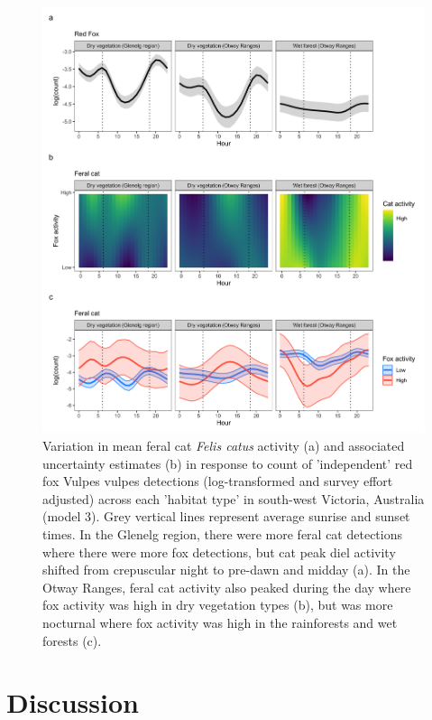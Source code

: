 \documentclass[11pt,a4paper,titlepage,twoside,openright]{style/unimelbthesis}
\begin{document}
\begin{mainmatter}
\begin{figure}
{\centering \includegraphics[width=1\linewidth]{figure/cat_fox_count} 

}

\caption{Variation in mean feral cat \textit{Felis catus} activity (a) and associated uncertainty estimates (b) in response to count of ’independent’ red fox Vulpes vulpes detections (log-transformed and survey effort adjusted) across each ’habitat type’ in south-west Victoria, Australia (model 3). Grey vertical lines represent average sunrise and sunset times. In the Glenelg region, there were more feral cat detections where there were more fox detections, but cat peak diel activity shifted from crepuscular night to pre-dawn and midday (a). In the Otway Ranges, feral cat activity also peaked during the day where fox activity was high in dry vegetation types (b), but was more nocturnal where fox activity was high in the rainforests and wet forests (c).}\label{fig:diel-cat-fox}
\end{figure}
\newpage

\hypertarget{discussion-3}{%
\section{Discussion}\label{discussion-3}}


\end{mainmatter}
\end{document}
